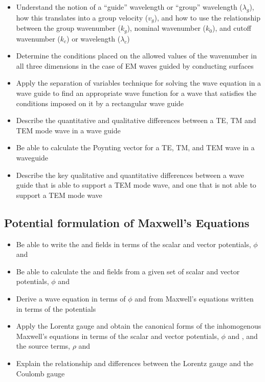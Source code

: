 \documentclass[12pt]{article}
\begin{document}
\begin{itemize}  
  \item Understand the notion of a ``guide'' wavelength or ``group'' wavelength ($\lambda_g$), how this translates into a group velocity ($v_g$), and how to use the relationship between the group wavenumber ($k_g$), nominal wavenumber ($k_0$), and cutoff wavenumber ($k_c$) or wavelength ($\lambda_c$)
  \item Determine the conditions placed on the allowed values of the wavenumber in all three dimensions in the case of EM waves guided by conducting surfaces
  \item Apply the separation of variables technique for solving the wave equation in a wave guide to find an appropriate wave function for a wave that satisfies the conditions imposed on it by a rectangular wave guide 
  \item Describe the quantitative and qualitative differences between a TE, TM and TEM mode wave in a wave guide
  \item Be able to calculate the Poynting vector for a TE, TM, and TEM wave in a waveguide
  \item Describe the key qualitative and quantitative differences between a wave guide that is able to support a TEM mode wave, and one that is not able to support a TEM mode wave
\end{itemize}

\subsection*{Potential formulation of Maxwell's Equations}

\begin{itemize}  
  \item Be able to write the \Evec and \Bvec fields in terms of the scalar and vector potentials, $\phi$ and \Avec
  \item Be able to calculate the \Evec and \Bvec fields from a given set of scalar and vector potentials, $\phi$ and \Avec
  \item Derive a wave equation in terms of $\phi$ and \Avec from Maxwell's equations written in terms of the potentials
  \item Apply the Lorentz gauge and obtain the canonical forms of the inhomogenous Maxwell's equations in terms of the scalar and vector potentials, $\phi$ and \Avec, and the source terms, $\rho$ and \Jvec
  \item Explain the relationship and differences between the Lorentz gauge and the Coulomb gauge
\end{itemize}
\end{document}
